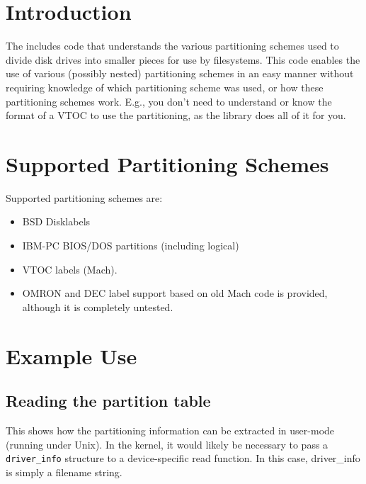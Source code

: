 %
% 
%
\label{diskpart}

\section{Introduction}

The \oskit{} includes code that understands the various
partitioning schemes used to divide disk drives into smaller pieces
for use by filesystems.
This code enables the use of various (possibly nested) partitioning
schemes in an easy manner without requiring knowledge of which partitioning
scheme was used, or how these partitioning schemes work.  E.g., you don't 
need to understand or know the format of a VTOC to use the partitioning, 
as the library does all of it for you.

\section{Supported Partitioning Schemes}

Supported partitioning schemes are:
\begin{itemize}
\item
BSD Disklabels
\item
IBM-PC BIOS/DOS partitions (including logical)
\item
VTOC labels (Mach).
\item
OMRON and DEC label support based on old Mach code is provided,
although it is completely untested.
\end{itemize}

\section{Example Use}

\subsection{Reading the partition table}

This shows how the partitioning information can be extracted in user-mode
(running under Unix).
In the kernel, it would likely be necessary to pass a
{\tt driver_info} structure 
to a device-specific read function.  In this case, 
driver_info is simply a filename string.

